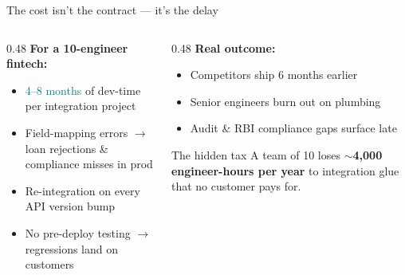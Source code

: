 \documentclass[aspectratio=169,11pt]{beamer}
\begin{document}
\begin{frame}{The cost isn't the contract --- it's the delay}
\vspace{0.2em}
\begin{columns}[T]
\begin{column}{0.48\textwidth}
\textbf{For a 10-engineer fintech:}
\begin{itemize}
\item \textcolor{teal}{4--8 months} of dev-time per integration project
\item Field-mapping errors $\to$ \textcolor{err}{loan rejections \& compliance misses} in prod
\item Re-integration on every API version bump
\item No pre-deploy testing $\to$ regressions land on customers
\end{itemize}
\end{column}
\begin{column}{0.48\textwidth}
\textbf{Real outcome:}
\begin{itemize}
\item Competitors ship 6 months earlier
\item Senior engineers burn out on plumbing
\item Audit \& RBI compliance gaps surface late
\end{itemize}
\vspace{0.4em}
\begin{block}{\textcolor{warn}{The hidden tax}}
A team of 10 loses $\sim$\textbf{4{,}000 engineer-hours per year} to integration glue that no customer pays for.
\end{block}
\end{column}
\end{columns}
\end{frame}
\end{document}
